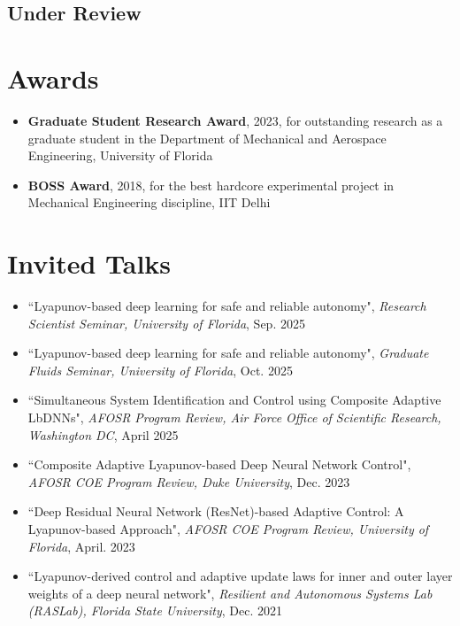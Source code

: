 \documentclass[10pt, letterpaper]{article}
\begin{document}
\subsection*{Under Review}
\printbibliography[keyword=underreview, heading=none, resetnumbers=false]

\section{Awards}

\begin{itemize}
    \item \textbf{Graduate Student Research Award}, 2023, for outstanding research as a graduate student in the Department of Mechanical and Aerospace Engineering, University of Florida
    \item \textbf{BOSS Award}, 2018, for the best hardcore experimental project in Mechanical Engineering discipline, IIT Delhi
\end{itemize}

\section{Invited Talks}

\begin{itemize}

\item{``Lyapunov-based deep learning for safe and reliable autonomy", \textit{Research Scientist Seminar, University of Florida}, Sep. 2025}

\item{``Lyapunov-based deep learning for safe and reliable autonomy", \textit{Graduate Fluids Seminar, University of Florida}, Oct. 2025}

\item{``Simultaneous System Identification and Control using Composite Adaptive LbDNNs", \textit{AFOSR Program Review, Air Force Office of Scientific Research, Washington DC}, April 2025}

\item{``Composite Adaptive Lyapunov-based Deep Neural Network Control", \textit{AFOSR COE Program Review, Duke University}, Dec. 2023}

\item{``Deep Residual Neural Network (ResNet)-based Adaptive Control: A Lyapunov-based Approach", \textit{AFOSR COE Program Review, University of Florida}, April. 2023}

\item{``Lyapunov-derived control and adaptive update laws for inner and outer layer weights of a deep neural network", \textit{Resilient and Autonomous Systems Lab (RASLab), Florida State University}, Dec. 2021}

\end{itemize}
\end{document}
